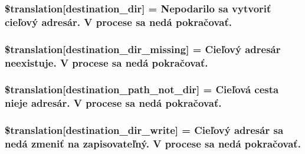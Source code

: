 \subsubsection[{\$translation}]{\setlength{\rightskip}{0pt plus 5cm}\$translation\mbox{[}\textquotesingle{}destination\+\_\+dir\textquotesingle{}\mbox{]} = \textquotesingle{}Nepodarilo sa vytvoriť cieľový adresár. V procese sa nedá pokračovať.\textquotesingle{}}\label{class_8upload_8sk___s_k_8php_aff2427c72a2598aefa6d58df1dd18b08}
\hypertarget{class_8upload_8sk___s_k_8php_a9ef28d3cf09942c6c0a1e77fa09185e8}{}
\subsubsection[{\$translation}]{\setlength{\rightskip}{0pt plus 5cm}\$translation\mbox{[}\textquotesingle{}destination\+\_\+dir\+\_\+missing\textquotesingle{}\mbox{]} = \textquotesingle{}Cieľový adresár neexistuje. V procese sa nedá pokračovať.\textquotesingle{}}\label{class_8upload_8sk___s_k_8php_a9ef28d3cf09942c6c0a1e77fa09185e8}
\hypertarget{class_8upload_8sk___s_k_8php_a5704a67137126e8c87b7a364175929d4}{}
\subsubsection[{\$translation}]{\setlength{\rightskip}{0pt plus 5cm}\$translation\mbox{[}\textquotesingle{}destination\+\_\+path\+\_\+not\+\_\+dir\textquotesingle{}\mbox{]} = \textquotesingle{}Cieľová cesta nieje adresár. V procese sa nedá pokračovať.\textquotesingle{}}\label{class_8upload_8sk___s_k_8php_a5704a67137126e8c87b7a364175929d4}
\hypertarget{class_8upload_8sk___s_k_8php_a97608ea194a616db49141a0e6dee900c}{}
\subsubsection[{\$translation}]{\setlength{\rightskip}{0pt plus 5cm}\$translation\mbox{[}\textquotesingle{}destination\+\_\+dir\+\_\+write\textquotesingle{}\mbox{]} = \textquotesingle{}Cieľový adresár sa nedá zmeniť na zapisovateľný. V procese sa nedá pokračovať.\textquotesingle{}}\label{class_8upload_8sk___s_k_8php_a97608ea194a616db49141a0e6dee900c}
\hypertarget{class_8upload_8sk___s_k_8php_a40e4e1962226b89fd76da5819a9602b0}{}

